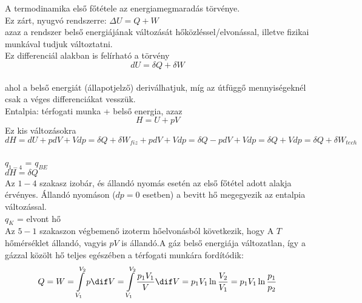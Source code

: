 A termodinamika első főtétele az energiamegmaradás törvénye.\\
Ez zárt, nyugvó rendszerre: $\Delta$$U=Q+W$ \\
azaz a rendszer belső energiájának változását hőközléssel/elvonással, illetve fizikai munkával tudjuk változtatni.\\
Ez differenciál alakban is felírható a törvény\\
\begin{equation*}
dU=\delta Q+ \delta W
\end{equation*} \\
ahol a belső energiát (állapotjelző) deriválhatjuk, míg az útfüggő mennyiségeknél csak a véges differenciákat vesszük.\\
Entalpia: térfogati munka + belső energia, azaz\\
\begin{equation*}
H=U+pV
\end{equation*}
Ez kis változásokra
\begin{equation*}
dH=dU+pdV+Vdp=\delta Q+\delta W_{fiz} +pdV+Vdp=\delta Q-pdV+Vdp=\delta Q+Vdp=\delta Q+\delta W_{tech}
\end{equation*}\\
$q_{1-4}$ =  $q_{BE}$\\
$dH = \delta Q$ \\
Az $1-4$ szakasz izobár, és állandó nyomás esetén az első főtétel adott alakja érvényes. Állandó nyomáson ($dp=0$ esetben) a bevitt hő megegyezik az entalpia változással.\\
$q_K$ = elvont hő\\
Az $5-1$ szakaszon végbemenő izoterm hőelvonásból következik, hogy A $T$ hőmérséklet állandó, vagyis $pV$ is állandó.A gáz belső energiája változatlan, így a gázzal közölt hő teljes egészében a térfogati munkára
fordítódik: 
\begin{equation*}
Q=W=\int\displaylimits_{V_1}^{V_2}p\dif V=\int\displaylimits_{V_1}^{V_2}\dfrac {p_1V_1}{V}\dif V=p_1V_1\ln{\dfrac{V_2}{V_1}}=p_1V_1\ln{\dfrac{p_1}{p_2}}
\end{equation*}


